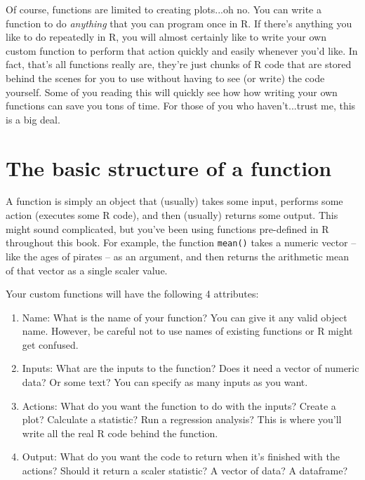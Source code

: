 \documentclass{tufte-book}\usepackage[]{graphicx}\usepackage[]{color}
\begin{document}
Of course, functions are limited to creating plots...oh no. You can write a function to do \textit{anything} that you can program once in R. If there's anything you like to do repeatedly in R, you will almost certainly like to write your own custom function to perform that action quickly and easily whenever you'd like. In fact, that's all functions really are, they're just chunks of R code that are stored behind the scenes for you to use without having to see (or write) the code yourself. Some of you reading this will quickly see how how writing your own functions can save you tons of time. For those of you who haven't...trust me, this is a big deal.

\section{The basic structure of a function}

A function is simply an object that (usually) takes some input, performs some action (executes some R code), and then (usually) returns some output. This might sound complicated, but you've been using functions pre-defined in R throughout this book. For example, the function \texttt{mean()} takes a numeric vector -- like the ages of pirates -- as an argument, and then returns the arithmetic mean of that vector as a single scaler value.

Your custom functions will have the following 4 attributes:

\begin{enumerate}

\item Name: What is the name of your function? You can give it any valid object name. However, be careful not to use names of existing functions or R might get confused.

\item Inputs: What are the inputs to the function? Does it need a vector of numeric data? Or some text? You can specify as many inputs as you want.

\item Actions: What do you want the function to do with the inputs? Create a plot? Calculate a statistic? Run a regression analysis? This is where you'll write all the real R code behind the function.

\item Output: What do you want the code to return when it's finished with the actions? Should it return a scaler statistic? A vector of data? A dataframe?

\end{enumerate}
\end{document}
